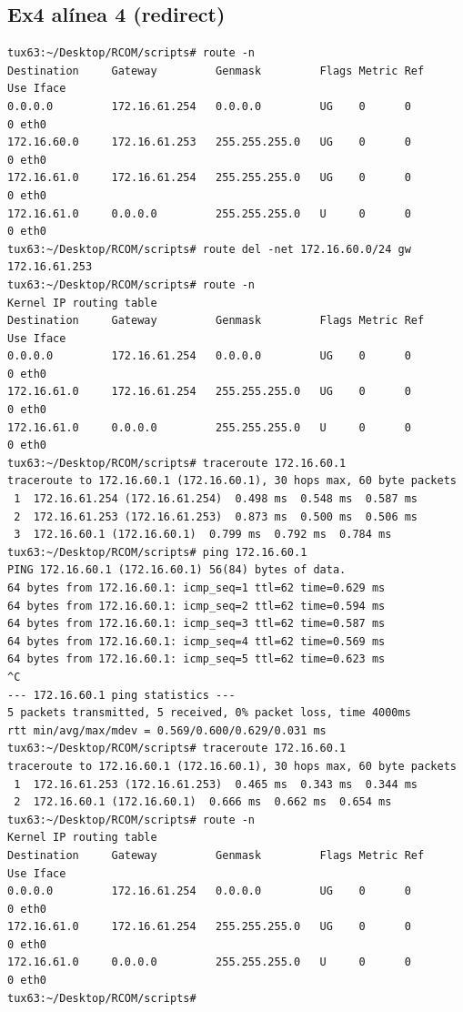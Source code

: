 \documentclass[11pt,a4paper,reqno]{report}
\numberwithin{equation}{section}
\begin{document}
\begin{appendices}
\section{Ex4 alínea 4 (redirect)}
\label{ex4_redirect}
\begin{lstlisting}[frame=single]
tux63:~/Desktop/RCOM/scripts# route -n
Destination     Gateway         Genmask         Flags Metric Ref    Use Iface
0.0.0.0         172.16.61.254   0.0.0.0         UG    0      0        0 eth0
172.16.60.0     172.16.61.253   255.255.255.0   UG    0      0        0 eth0
172.16.61.0     172.16.61.254   255.255.255.0   UG    0      0        0 eth0
172.16.61.0     0.0.0.0         255.255.255.0   U     0      0        0 eth0
tux63:~/Desktop/RCOM/scripts# route del -net 172.16.60.0/24 gw 172.16.61.253
tux63:~/Desktop/RCOM/scripts# route -n
Kernel IP routing table
Destination     Gateway         Genmask         Flags Metric Ref    Use Iface
0.0.0.0         172.16.61.254   0.0.0.0         UG    0      0        0 eth0
172.16.61.0     172.16.61.254   255.255.255.0   UG    0      0        0 eth0
172.16.61.0     0.0.0.0         255.255.255.0   U     0      0        0 eth0
tux63:~/Desktop/RCOM/scripts# traceroute 172.16.60.1
traceroute to 172.16.60.1 (172.16.60.1), 30 hops max, 60 byte packets
 1  172.16.61.254 (172.16.61.254)  0.498 ms  0.548 ms  0.587 ms
 2  172.16.61.253 (172.16.61.253)  0.873 ms  0.500 ms  0.506 ms
 3  172.16.60.1 (172.16.60.1)  0.799 ms  0.792 ms  0.784 ms
tux63:~/Desktop/RCOM/scripts# ping 172.16.60.1
PING 172.16.60.1 (172.16.60.1) 56(84) bytes of data.
64 bytes from 172.16.60.1: icmp_seq=1 ttl=62 time=0.629 ms
64 bytes from 172.16.60.1: icmp_seq=2 ttl=62 time=0.594 ms
64 bytes from 172.16.60.1: icmp_seq=3 ttl=62 time=0.587 ms
64 bytes from 172.16.60.1: icmp_seq=4 ttl=62 time=0.569 ms
64 bytes from 172.16.60.1: icmp_seq=5 ttl=62 time=0.623 ms
^C
--- 172.16.60.1 ping statistics ---
5 packets transmitted, 5 received, 0% packet loss, time 4000ms
rtt min/avg/max/mdev = 0.569/0.600/0.629/0.031 ms
tux63:~/Desktop/RCOM/scripts# traceroute 172.16.60.1
traceroute to 172.16.60.1 (172.16.60.1), 30 hops max, 60 byte packets
 1  172.16.61.253 (172.16.61.253)  0.465 ms  0.343 ms  0.344 ms
 2  172.16.60.1 (172.16.60.1)  0.666 ms  0.662 ms  0.654 ms
tux63:~/Desktop/RCOM/scripts# route -n
Kernel IP routing table
Destination     Gateway         Genmask         Flags Metric Ref    Use Iface
0.0.0.0         172.16.61.254   0.0.0.0         UG    0      0        0 eth0
172.16.61.0     172.16.61.254   255.255.255.0   UG    0      0        0 eth0
172.16.61.0     0.0.0.0         255.255.255.0   U     0      0        0 eth0
tux63:~/Desktop/RCOM/scripts# 
\end{lstlisting}


\end{appendices}
\end{document}
